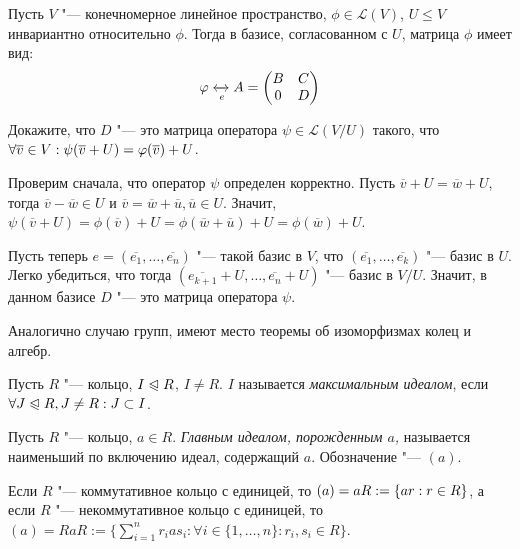 \begin{exercise}
	Пусть $V$ "--- конечномерное линейное пространство, $\phi \in \mathcal{L}(V)$, $U \le V$ инвариантно относительно $\phi$. Тогда в базисе, согласованном с $U$, матрица $\phi$ имеет вид:
	\[\phi \xleftrightarrow[e]{} A = \begin{pmatrix}B & C \\ 0 & D\end{pmatrix}\]
	
	Докажите, что $D$ "--- это матрица оператора $\psi \in \mathcal{L}(V / U)$ такого, что $\forall \overline{v} \in V: \psi(\overline{v} \hm+ U) = \phi(\overline{v}) + U$.
\end{exercise}

\begin{solution}
	Проверим сначала, что оператор $\psi$ определен корректно. Пусть $\overline{v} + U = \overline{w} + U$, тогда $\overline{v} - \overline{w} \in U$ и $\overline{v} = \overline{w} + \overline{u}, \overline{u} \in U$. Значит, $\psi(\overline{v} + U) = \phi(\overline{v}) + U = \phi(\overline{w} + \overline{u}) + U = \phi(\overline{w}) + U$.
	
	Пусть теперь $e = (\overline{e_1}, \dotsc, \overline{e_n})$ "--- такой базис в $V$, что $(\overline{e_1}, \dotsc, \overline{e_k})$ "--- базис в $U$. Легко убедиться, что тогда $(\overline{e_{k+1}} + U, \dotsc, \overline{e_n} + U)$ "--- базис в $V / U$. Значит, в данном базисе $D$ "--- это матрица оператора $\psi$.
\end{solution}

\begin{note}
	Аналогично случаю групп, имеют место теоремы об изоморфизмах колец и алгебр.
\end{note}

\begin{definition}
	Пусть $R$ "--- кольцо, $I \normal R$, $I \ne R$. $I$ называется \textit{максимальным идеалом}, если $\forall J \normal R, J \ne R: J \subset I$. 
\end{definition}
	
\begin{definition}
	Пусть $R$ "--- кольцо, $a \in R$. \textit{Главным идеалом, порожденным $a$,} называется наименьший по включению идеал, содержащий $a$. Обозначение "--- $(a)$.
\end{definition}

\begin{note}
	Если $R$ "--- коммутативное кольцо с единицей, то $(a) \hm= aR := \{ar: r \in R\}$, а если $R$ "--- некоммутативное кольцо с единицей, то $(a) = RaR := \{\sum_{i = 1}^nr_ias_i : \forall i \in \{1, \dotsc, n\}: r_i, s_i \in R\}$.
\end{note}

